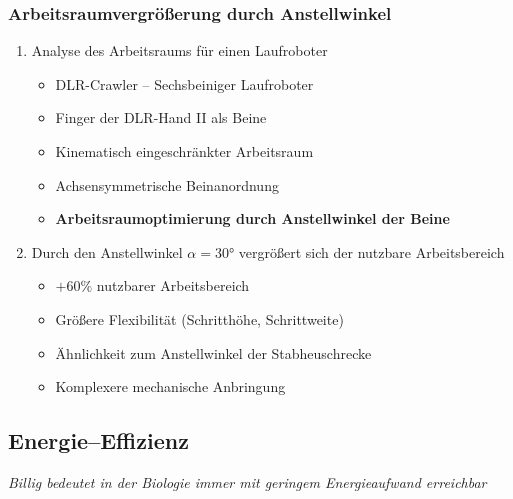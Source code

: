 \subsubsection{Arbeitsraumvergrößerung durch Anstellwinkel}
\begin{enumerate}
	\item Analyse des Arbeitsraums für einen Laufroboter
	\begin{itemize}
		\item DLR-Crawler -- Sechsbeiniger Laufroboter
		\item Finger der DLR-Hand II als Beine
		\item Kinematisch eingeschränkter Arbeitsraum
		\item Achsensymmetrische Beinanordnung
		\item \textbf{Arbeitsraumoptimierung durch Anstellwinkel der Beine}
	\end{itemize}
	\item Durch den Anstellwinkel $\alpha = 30°$ vergrößert sich der nutzbare Arbeitsbereich
	\begin{itemize}
		\item $+60\%$ nutzbarer Arbeitsbereich
		\item Größere Flexibilität (Schritthöhe, Schrittweite)
		\item Ähnlichkeit zum Anstellwinkel der Stabheuschrecke
		\item Komplexere mechanische Anbringung
	\end{itemize}
\end{enumerate}


\subsection{Energie--Effizienz}
\emph{Billig bedeutet in der Biologie immer \glqq mit geringem Energieaufwand erreichbar\grqq}
